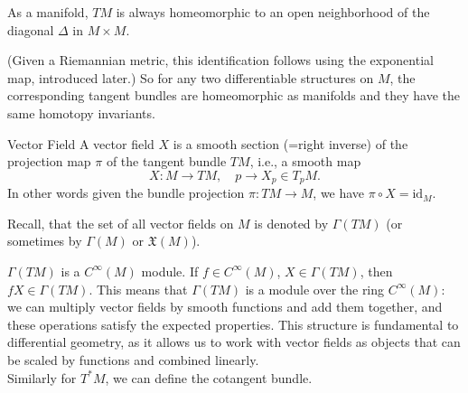 \begin{colremark}
As a manifold, $TM$ is always homeomorphic to an open neighborhood of the diagonal $\Delta$ in $M \times M$.

\begin{figure}[H]
\begin{center}
\end{center}
\end{figure}
\end{colremark}


(Given a Riemannian metric, this identification follows using the exponential map, introduced later.) So for any two differentiable structures on $M$, the corresponding tangent bundles are homeomorphic as manifolds and they have the same homotopy invariants.\\

\begin{colordef}{Vector Field}{}
A vector field $X$ is a smooth section (=right inverse) of the projection map $\pi$ of the tangent bundle $TM$, i.e., a smooth map
\[
X: M \longrightarrow TM, \quad p \longrightarrow X_p \in T_p M.
\]
In other words given  the bundle projection $\pi: TM \to M$, we have $\pi \circ X = \mathrm{id}_M$.

Recall, that the set of all vector fields on $M$ is denoted by $\Gamma(TM)$ (or sometimes by $\Gamma(M)$ or $\mathfrak{X}(M)$).
\end{colordef}

$\Gamma(TM)$ is a $C^\infty(M)$ module. If $f \in C^\infty(M)$, $X \in \Gamma(TM)$, then $fX \in \Gamma(TM)$. This means that $\Gamma(TM)$ is a module over the ring $C^\infty(M)$: we can multiply vector fields by smooth functions and add them together, and these operations satisfy the expected properties. This structure is fundamental to differential geometry, as it allows us to work with vector fields as objects that can be scaled by functions and combined linearly.\\

Similarly for $T^*M$, we can define the cotangent bundle.

